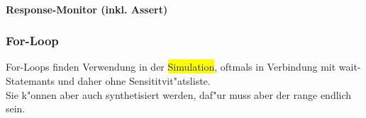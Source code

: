 %				
%					
%					
%					
		\begin{minipage}{0.63\textwidth}
			\paragraph{Response-Monitor (inkl. Assert)}
				
		\end{minipage}
		\hfill
		\begin{minipage}{0.35\textwidth}
		\subsubsection{For-Loop} %
				For-Loops finden Verwendung in der \colorbox{yellow}{Simulation}, oftmals in Verbindung mit wait-Statemants und daher ohne Sensititvit"atsliste.\\
				Sie k"onnen aber auch synthetisiert werden, daf"ur muss aber der range 
				endlich sein.
				
		\end{minipage}
			
